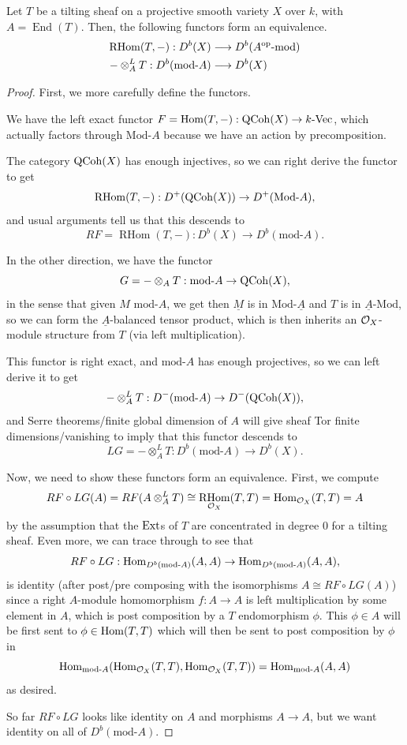 \documentclass[12pt]{article}
\DeclareMathOperator{\End}{End}
\DeclareMathOperator{\RHom}{RHom}
\newcommand{\rmod}{\mathrm{mod}\text{-}}
\newcommand{\rMod}{\mathrm{Mod}\text{-}}
\newcommand{\lmod}{\text{-}\mathrm{mod}}
\newcommand{\lMod}{\text{-}\mathrm{Mod}}
\begin{document}
\newpage
\begin{thm}
    Let $T$ be a tilting sheaf on a projective smooth variety $X$ over $k$, with $A=\End(T)$. Then, the following functors form an equivalence.
    \begin{align*}
        \RHom(T,-): D^b(X) &\longrightarrow D^b(A^\op \lmod)\\
        - \otimes_A^L T: D^b(\rmod A) &\longrightarrow D^b(X)
    \end{align*}
\end{thm}
\begin{proof}
    First, we more carefully define the functors.
    
    We have the left exact functor $F=\mathrm{Hom}(T,-): \mathrm{QCoh}(X) \to k\text{-}\mathrm{Vec}$, which actually factors through $\rMod A$ because we have an action by precomposition.
    
    The category $\mathrm{QCoh}(X)$ has enough injectives, so we can right derive the functor to get
    \[\RHom(T,-): D^+(\QCoh(X)) \to D^+(\rMod A),\]
    and usual arguments tell us that this descends to
    \[RF = \RHom(T,-): D^b(X) \to D^b(\rmod A).\]

    In the other direction, we have the functor
    \[G = - \otimes_A T: \rmod A \to \QCoh(X),\]
    in the sense that given $M$ \in $\rmod A$, we get then $\underline{M}$ is in $\rMod \underline{A}$ and $T$ is in $\underline{A} \lMod$, so we can form the $\underline{A}$-balanced tensor product, which is then inherits an $\mathcal{O}_X$-module structure from $T$ (via left multiplication).

    This functor is right exact, and $\rmod A$ has enough projectives, so we can left derive it to get
    \[- \otimes_A^L T: D^-(\rmod A) \to D^-(\QCoh(X)),\]
    and Serre theorems/finite global dimension of $A$ will give sheaf Tor finite dimensions/vanishing to imply that this functor descends to
    \[LG = - \otimes_A^L T: D^b(\rmod A) \to D^b(X).\]

    Now, we need to show these functors form an equivalence. First, we compute
    \[RF\circ LG(A) = RF(A\otimes_A^L T) \cong \RHom_{\cO_X}(T,T) = \Hom_{\cO_X}(T,T) = A\]
    by the assumption that the $\mathrm{Ext}$s of $T$ are concentrated in degree 0 for a tilting sheaf. Even more, we can trace through to see that
    \[RF\circ LG: \Hom_{D^b(\rmod A)}(A,A) \to \Hom_{D^b(\rmod A)}(A,A),\]
    is identity (after post/pre composing with the isomorphisms $A\cong RF\circ LG(A)$) since a right $A$-module homomorphism $f:A\to A$ is left multiplication by some element in $A$, which is post composition by a $T$ endomorphism $\phi$. This $\phi \in A$ will be first sent to $\phi \in \Hom(T,T)$ which will then be sent to post composition by $\phi$ in
    \[\Hom_{\rmod A}(\Hom_{\cO_X}(T,T),\Hom_{\cO_X}(T,T)) = \Hom_{\rmod A}(A,A)\]
    as desired.

    So far $RF\circ LG$ looks like identity on $A$ and morphisms $A\to A$, but we want identity on all of $D^b(\rmod A)$. 
\end{proof}

\nocite{*} %
\end{document}
